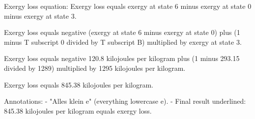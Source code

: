 Exergy loss equation:  
Exergy loss equals exergy at state 6 minus exergy at state 0 minus exergy at state 3.  

Exergy loss equals negative (exergy at state 6 minus exergy at state 0) plus (1 minus T subscript 0 divided by T subscript B) multiplied by exergy at state 3.  

Exergy loss equals negative 120.8 kilojoules per kilogram plus (1 minus 293.15 divided by 1289) multiplied by 1295 kilojoules per kilogram.  

Exergy loss equals 845.38 kilojoules per kilogram.  

Annotations:  
- "Alles klein e" (everything lowercase e).  
- Final result underlined: 845.38 kilojoules per kilogram equals exergy loss.